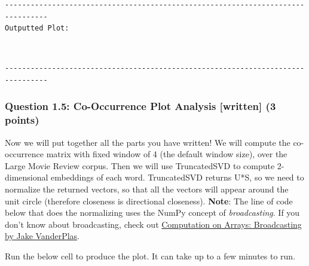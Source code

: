 \documentclass[11pt]{article}
\begin{document}
    \begin{Verbatim}[commandchars=\\\{\}]
--------------------------------------------------------------------------------
Outputted Plot:
    \end{Verbatim}

    \begin{center}
    \end{center}
    { \hspace*{\fill} \\}
    
    \begin{Verbatim}[commandchars=\\\{\}]
--------------------------------------------------------------------------------
    \end{Verbatim}

    \subsubsection{Question 1.5: Co-Occurrence Plot Analysis {[}written{]}
(3
points)}\label{question-1.5-co-occurrence-plot-analysis-written-3-points}

Now we will put together all the parts you have written! We will compute
the co-occurrence matrix with fixed window of 4 (the default window
size), over the Large Movie Review corpus. Then we will use TruncatedSVD
to compute 2-dimensional embeddings of each word. TruncatedSVD returns
U*S, so we need to normalize the returned vectors, so that all the
vectors will appear around the unit circle (therefore closeness is
directional closeness). \textbf{Note}: The line of code below that does
the normalizing uses the NumPy concept of \emph{broadcasting}. If you
don't know about broadcasting, check out
\href{https://jakevdp.github.io/PythonDataScienceHandbook/02.05-computation-on-arrays-broadcasting.html}{Computation
on Arrays: Broadcasting by Jake VanderPlas}.

Run the below cell to produce the plot. It can take up to a few minutes
to run.
\end{document}
